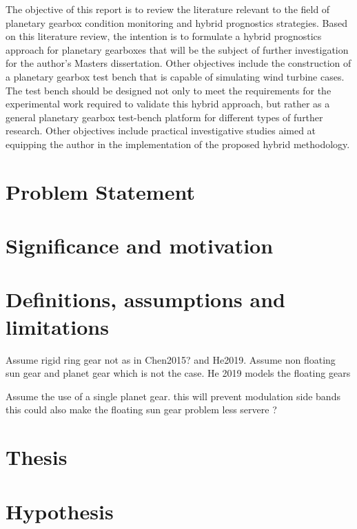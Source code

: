 The objective of this report is to review the literature relevant to the field of planetary gearbox condition monitoring and hybrid prognostics strategies. Based on this literature review, the intention is to formulate a hybrid prognostics approach for planetary gearboxes that will be the subject of further investigation for the author's Masters dissertation. Other objectives include the construction of a planetary gearbox test bench that is capable of simulating wind turbine cases. The test bench should be designed not only to meet the requirements for the experimental work required to validate this hybrid approach, but rather as a general planetary gearbox test-bench platform for different types of further research. Other objectives include practical investigative studies aimed at equipping the author in the implementation of the proposed hybrid methodology.


\section{Problem Statement}


\section{Significance and motivation}


\section{Definitions, assumptions and limitations}
Assume rigid ring gear not as in Chen2015? and He2019. Assume non floating sun gear and planet gear which is not the case. He 2019 models the floating gears

Assume the use of a single planet gear. this will prevent modulation side bands this could also make the floating sun gear problem less servere ?

\section{Thesis}

\section{Hypothesis}

